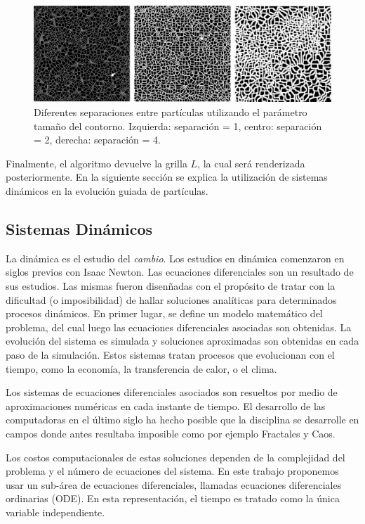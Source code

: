 \documentclass[oneside,a4paper,spanish,links]{amca}
\begin{document}
\begin{figure}[htb!]
  \centerline{\includegraphics[scale=0.22]{fig1.pdf}}
  \caption{Diferentes separaciones entre part\'iculas utilizando el par\'ametro tama\~no del contorno. Izquierda: separaci\'on = 1, centro: separaci\'on = 2, derecha: separaci\'on = 4.}
  \label{fg:fig1}
\end{figure}

Finalmente, el algoritmo devuelve la grilla $L$, la cual ser\'a renderizada posteriormente. En la siguiente secci\'on se explica la utilizaci\'on de sistemas din\'amicos en la evoluci\'on guiada de part\'iculas.

\subsection{Sistemas Din\'amicos}

La din\'amica es el estudio del {\em cambio}. Los estudios en din\'amica comenzaron en siglos previos con Isaac Newton. Las ecuaciones diferenciales son un resultado de sus estudios. Las mismas fueron disen\~nadas con el prop\'osito de tratar con la dificultad (o imposibilidad) de hallar soluciones anal\'iticas para determinados procesos din\'amicos. En primer lugar, se define un modelo matem\'atico del problema, del cual luego las ecuaciones diferenciales asociadas son obtenidas. La evoluci\'on del sistema es simulada y soluciones aproximadas son obtenidas en cada paso de la simulaci\'on. Estos sistemas tratan procesos que evolucionan con el tiempo, como la econom\'ia, la transferencia de calor, o el clima.

Los sistemas de ecuaciones diferenciales asociados son resueltos por medio de aproximaciones num\'ericas en cada instante de tiempo. El desarrollo de las computadoras en el \'ultimo siglo ha hecho posible que la disciplina se desarrolle en campos donde antes resultaba imposible como por ejemplo Fractales \citep{Mandelbrot83} y Caos.

Los costos computacionales de estas soluciones dependen de la complejidad del problema y el n\'umero de ecuaciones del sistema. En este trabajo proponemos usar un sub-\'area de ecuaciones diferenciales, llamadas ecuaciones diferenciales ordinarias (ODE). En esta representaci\'on, el tiempo es tratado como la \'unica variable independiente.
\end{document}
